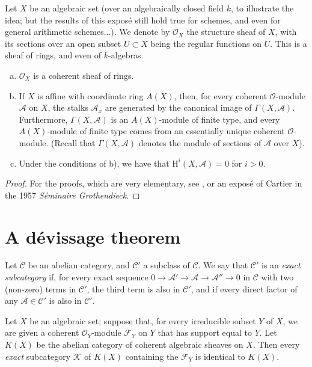 \documentclass{article}
\theoremstyle{plain}
\newenvironment{theorem}[1]
    {\renewcommand\theinnercustomtheorem{#1}\innercustomtheorem}
    {\endinnercustomtheorem}
\theoremstyle{definition}
\newenvironment{definition}[1]
    {\renewcommand\theinnercustomdefinition{#1}\innercustomdefinition}
    {\endinnercustomdefinition}
\newcommand{\sh}{\mathscr}
\newcommand{\cat}{\mathcal}
\newcommand{\HH}{\mathrm{H}}
\newcommand{\oldpage}[1]{\marginpar{\footnotesize$\Big\vert$ \textit{p.~#1}}}
\begin{document}
Let $X$ be an algebraic set (over an algebraically closed field $k$, to illustrate the idea; but the results of this expos\'{e} still hold true for schemes, and even for general arithmetic schemes...).
We denote by $\sh{O}_X$ the structure sheaf of $X$, with its sections over an open subset $U\subset X$ being the regular functions on $U$.
This is a sheaf of rings, and even of $k$-algebras.

\begin{theorem}{1}
\label{theorem1}
\begin{enumerate}[(a)]
  \item $\sh{O}_X$ is a coherent sheaf of rings.
  \item If $X$ is affine with coordinate ring $A(X)$, then, for every coherent $\sh{O}$-module $\sh{A}$ on $X$, the stalks $\sh{A}_x$ are generated by the canonical image of $\Gamma(X,\sh{A})$.
    Furthermore, $\Gamma(X,\sh{A})$ is an $A(X)$-module of finite type, and every $A(X)$-module of finite type comes from an essentially unique coherent $\sh{O}$-module.
    (Recall that $\Gamma(X,\sh{A})$ denotes the module of sections of $\sh{A}$ over $X$).
  \item Under the conditions of b), we have that $\HH^i(X,\sh{A})=0$ for $i>0$.
\oldpage{2-02}
\end{enumerate}
\end{theorem}

\begin{proof}
  For the proofs, which are very elementary, see \cite[chapitre~2, paragraphes~2,3,4]{1}, or an expos\'{e} of Cartier in the 1957 \emph{S\'{e}minaire Grothendieck}.
\end{proof}


\section{A d\'{e}vissage theorem}
\label{section2}

\begin{definition}{1}
\label{definition1}
  Let $\cat{C}$ be an abelian category, and $\cat{C}'$ a subclass of $\cat{C}$.
  We say that $\cat{C}'$ is an \emph{exact subcategory} if, for every exact sequence $0\to\sh{A}'\to\sh{A}\to\sh{A}''\to0$ in $\cat{C}$ with two (non-zero) terms in $\cat{C}'$, the third term is also in $\cat{C}'$, and if every direct factor of any $\sh{A}\in\cat{C}'$ is also in $\cat{C}'$.
\end{definition}

\begin{theorem}{2}
\label{theorem2}
  Let $X$ be an algebraic set;
  suppose that, for every irreducible subset $Y$ of $X$, we are given a coherent $\sh{O}_Y$-module $\sh{F}_Y$ on $Y$ that has support equal to $Y$.
  Let $K(X)$ be the abelian category of coherent algebraic sheaves on $X$.
  Then every \emph{exact} subcategory $\cat{K}$ of $K(X)$ containing the $\sh{F}_Y$ is identical to $K(X)$.
\end{theorem}
\end{document}
